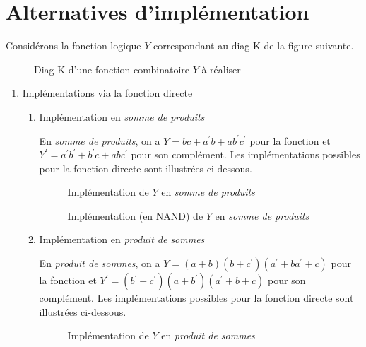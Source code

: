 \documentclass[letter, oneside]{book}
\begin{document}
\section{Alternatives d'implémentation}
\label{sec:orgcb3e027}

Considérons la fonction logique \(Y\) correspondant au diag-K de la
figure suivante.

\begin{figure}[htbp]
\centering

\caption{\label{fig:orgfda2575}Diag-K d'une fonction combinatoire \(Y\) à réaliser}
\end{figure} 

\begin{enumerate}
\item Implémentations via la fonction directe
\label{sec:orgdd96a99}

\begin{enumerate}
\item Implémentation en \emph{somme de produits}
\label{sec:org6b5e1f2}

En \emph{somme de produits}, on a \(Y = bc + a^\prime b + a b^\prime
c^\prime\) pour la fonction et \(Y^\prime = a^\prime b^\prime +
b^\prime c + a b c^\prime\) pour son complément. Les implémentations
possibles pour la fonction directe sont illustrées ci-dessous.

\begin{figure}[htbp]
\centering

\caption{\label{fig:org682b024}Implémentation de \(Y\) en \emph{somme de produits}}
\end{figure} 


\begin{figure}[htbp]
\centering

\caption{\label{fig:orgc527dac}Implémentation (en NAND) de \(Y\) en \emph{somme de produits}}
\end{figure} 


\item Implémentation en \emph{produit de sommes}
\label{sec:org8a4321c}

En \emph{produit de sommes}, on a \(Y =(a + b ) (b + c^\prime ) (a^\prime +
ba^\prime + c)\) pour la fonction et \(Y^\prime = (b^\prime +c^\prime
)(a+b^\prime )(a^\prime +b+c)\) pour son complément.  Les implémentations
possibles pour la fonction directe sont illustrées ci-dessous.


\begin{figure}[htbp]
\centering

\caption{\label{fig:orge4b7f55}Implémentation de \(Y\) en \emph{produit de sommes}}
\end{figure} 


\end{enumerate}
\end{enumerate}
\end{document}
